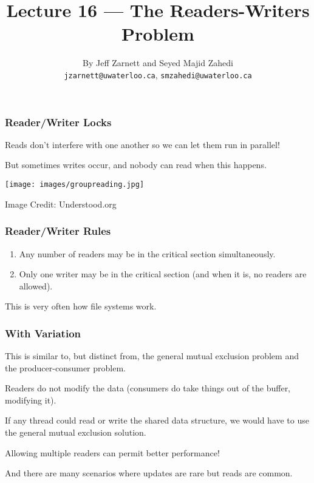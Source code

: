 
\usepackage{multirow}

\title{Lecture 16 --- The Readers-Writers Problem }

\author{By Jeff Zarnett and Seyed Majid Zahedi \\ \small \texttt{jzarnett@uwaterloo.ca}, \texttt{smzahedi@uwaterloo.ca}}
\date{}




\begin{frame}
	\titlepage

\end{frame}

\begin{frame}
	\frametitle{Reader/Writer Locks}
	Reads don't interfere with one another so we can let them run in parallel!

	But sometimes writes occur, and nobody can read when this happens.

	\begin{center}
		\texttt{[image: images/groupreading.jpg]}
	\end{center}
	\hfill Image Credit: Understood.org
\end{frame}

\begin{frame}
	\frametitle{Reader/Writer Rules}


	\begin{enumerate}
		\item Any number of readers may be in the critical section simultaneously.
		\item Only one writer may be in the critical section (and when it is, no readers are allowed).
	\end{enumerate}


	This is very often how file systems work.

\end{frame}


\begin{frame}
	\frametitle{With Variation}

	This is similar to, but distinct from, the general mutual exclusion problem and the producer-consumer problem.

	Readers do not modify the data (consumers do take things out of the buffer, modifying it).

	If any thread could read or write the shared data structure, we would have to use the general mutual exclusion solution.

	Allowing multiple readers can permit better performance!

	And there are many scenarios where updates are rare but reads are common.

\end{frame}

